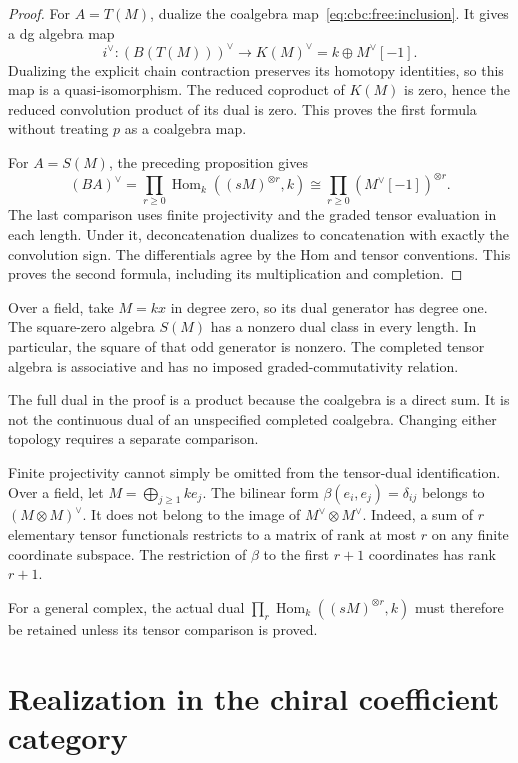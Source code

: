 \begin{proof}
For $A=T(M)$, dualize the coalgebra map~\eqref{eq:cbc:free:inclusion}.
It gives a dg algebra map
\[
 i^\vee:(B(T(M)))^\vee\longrightarrow K(M)^\vee
       =k\oplus M^\vee[-1].
\]
Dualizing the explicit chain contraction preserves its homotopy identities, so this map is a quasi-isomorphism.
The reduced coproduct of $K(M)$ is zero, hence the reduced convolution product of its dual is zero.
This proves the first formula without treating $p$ as a coalgebra map.

For $A=S(M)$, the preceding proposition gives
\[
 (BA)^\vee
 =\prod_{r\ge0}\operatorname{Hom}_k((sM)^{\otimes r},k)
 \cong\prod_{r\ge0}(M^\vee[-1])^{\otimes r}.
\]
The last comparison uses finite projectivity and the graded tensor evaluation in each length.
Under it, deconcatenation dualizes to concatenation with exactly the convolution sign.
The differentials agree by the Hom and tensor conventions.
This proves the second formula, including its multiplication and completion.
\end{proof}

Over a field, take $M=kx$ in degree zero, so its dual generator has degree one.
The square-zero algebra $S(M)$ has a nonzero dual class in every length.
In particular, the square of that odd generator is nonzero.
The completed tensor algebra is associative and has no imposed graded-commutativity relation.

The full dual in the proof is a product because the coalgebra is a direct sum.
It is not the continuous dual of an unspecified completed coalgebra.
Changing either topology requires a separate comparison.

Finite projectivity cannot simply be omitted from the tensor-dual identification.
Over a field, let $M=\bigoplus_{j\ge1}ke_j$.
The bilinear form $\beta(e_i,e_j)=\delta_{ij}$ belongs to $(M\otimes M)^\vee$.
It does not belong to the image of $M^\vee\otimes M^\vee$.
Indeed, a sum of $r$ elementary tensor functionals restricts to a matrix of rank at most $r$ on any finite coordinate subspace.
The restriction of $\beta$ to the first $r+1$ coordinates has rank $r+1$.

For a general complex, the actual dual $\prod_r\operatorname{Hom}_k((sM)^{\otimes r},k)$ must therefore be retained unless its tensor comparison is proved.

\section{Realization in the chiral coefficient category}

